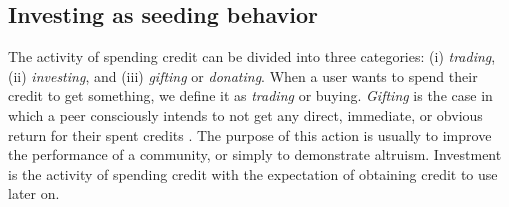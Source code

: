 \subsection{Investing as seeding behavior}
The activity of spending credit can be divided into three categories: (i) \textit{trading}, (ii) \textit{investing}, and (iii) \textit{gifting} or \textit{donating}. When a user wants to spend their credit to get something, we define it as \textit{trading} or buying. \textit{Gifting} is the case in which a peer consciously intends to not get any direct, immediate, or obvious return for their spent credits \cite{2006:gifting:ripeanu}. The purpose of this action is usually to improve the performance of a community, or simply to demonstrate altruism. Investment is the activity of spending credit with the expectation of obtaining credit to use later on. 



